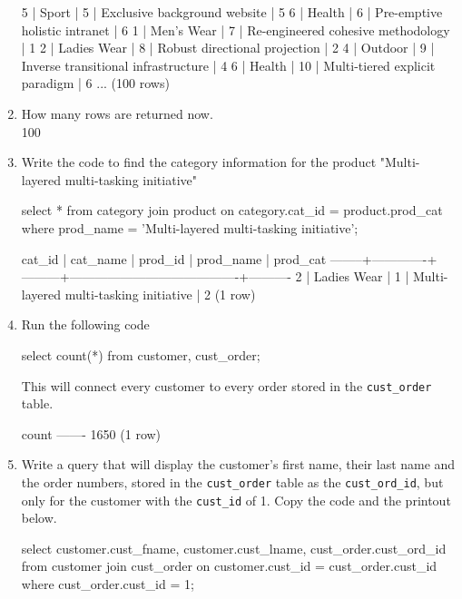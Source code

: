 \begin{enumerate}
\begin{pseudo*}
      5 | Sport       |       5 | Exclusive background website                     |        5   
      6 | Health      |       6 | Pre-emptive holistic intranet                    |        6   
      1 | Men's Wear  |       7 | Re-engineered cohesive methodology               |        1   
      2 | Ladies Wear |       8 | Robust directional projection                    |        2   
      4 | Outdoor     |       9 | Inverse transitional infrastructure              |        4   
      6 | Health      |      10 | Multi-tiered explicit paradigm                   |        6 
... 
(100 rows)
\end{pseudo*}
\item How many rows are returned now.\\
100
\item Write the code to find the category information for the product "Multi-layered multi-tasking initiative"
\begin{sql}
select * from category
join product on category.cat_id = product.prod_cat
where prod_name = 'Multi-layered multi-tasking initiative';
\end{sql}
\begin{pseudo*}
 cat_id |  cat_name   | prod_id |               prod_name                | prod_cat
--------+-------------+---------+----------------------------------------+----------
      2 | Ladies Wear |       1 | Multi-layered multi-tasking initiative |        2
(1 row)
\end{pseudo*}
\item Run the following code
\begin{sql}
select count(*) from customer, cust_order;
\end{sql}
This will connect every customer to every order stored in the \verb|cust_order| table.
\begin{pseudo*}
 count
-------
  1650
(1 row)
\end{pseudo*}
\item Write a query that will display the customer's first name, their last name and the order numbers, stored in the \verb|cust_order| table as the \verb|cust_ord_id|, but only for the customer with the \verb|cust_id| of 1. Copy the code and the printout below. 
\begin{sql}
select customer.cust_fname, customer.cust_lname, cust_order.cust_ord_id from customer
join cust_order on customer.cust_id = cust_order.cust_id
where cust_order.cust_id = 1;
\end{sql}
\begin{pseudo*}

\end{pseudo*}
\end{enumerate}
